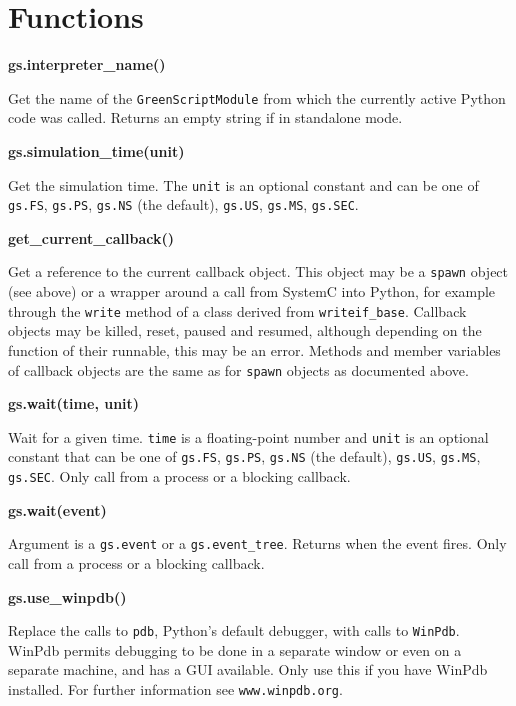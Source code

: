 \documentclass[12pt,oneside]{gsbook}
\begin{document}
\section{Functions}


\newcommand{\func}[2]{\par\vspace{10pt}\noindent
\textbf{#1}\par\vspace{5pt}\indent\parbox{16.5cm}{#2}\par}

\func {gs.interpreter\_name()} {Get the name of the \texttt{GreenScriptModule}
from which the currently active Python code was called.  Returns an
empty string if in standalone mode.}

\func {gs.simulation\_time(unit)} {Get the simulation time. The
\texttt{unit} is an optional constant and can be one of
\texttt{gs.FS}, \texttt{gs.PS}, \texttt{gs.NS} (the
default), \texttt{gs.US}, \texttt{gs.MS},
\texttt{gs.SEC}.}

\func {get\_current\_callback()} {Get a reference to the current
callback object.  This object may be a \texttt{spawn} object (see
above) or a wrapper around a call from SystemC into Python, for
example through the \texttt{write} method of a class derived from
\texttt{writeif\_base}.  Callback objects may be killed, reset,
paused and resumed, although depending on the function of their
runnable, this may be an error.  Methods and member variables of
callback objects are the same as for \texttt{spawn} objects as
documented above.}

\func {gs.wait(time, unit)} {Wait for a given time. \texttt{time} is a
floating-point number and \texttt{unit} is an optional constant that can be
one of \texttt{gs.FS}, \texttt{gs.PS}, \texttt{gs.NS} (the
default), \texttt{gs.US}, \texttt{gs.MS},
\texttt{gs.SEC}. Only call from a process or a blocking callback.}

\func {gs.wait(event)} {Argument is a \texttt{gs.event} or a
\texttt{gs.event\_tree}. Returns when the event fires.  Only call from
a process or a blocking callback.}

\newpage

\func {gs.use\_winpdb()} {Replace the calls to \texttt{pdb}, Python's
default debugger, with calls to \texttt{WinPdb}.  WinPdb permits
debugging to be done in a separate window or even on a separate
machine, and has a GUI available.  Only use this if you have WinPdb
installed.  For further information see \texttt{www.winpdb.org}.}
\end{document}
